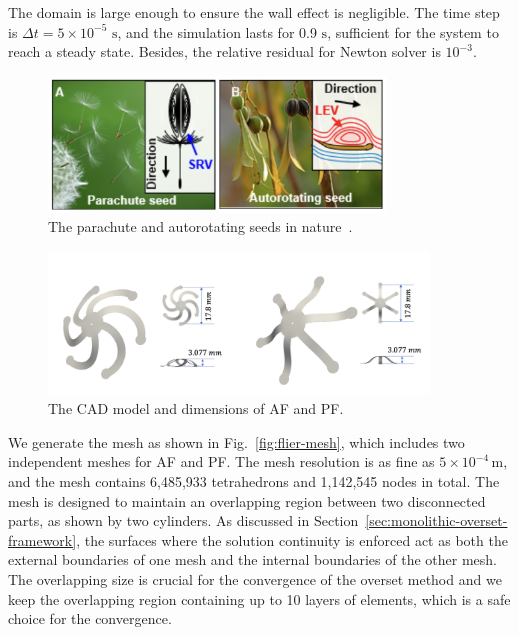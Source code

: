 \documentclass[preprint,12pt,sort&compress]{elsarticle}
\theoremstyle{definition}%
\begin{document}
The domain is large enough to ensure the wall effect is negligible.
The time step is $\Delta t=5\times 10^{-5}$ $\mathrm{s}$, and the simulation lasts for 0.9 $\mathrm{s}$, sufficient for the system to reach a steady state.
Besides, the relative residual for Newton solver
is $10^{-3}$.\\
\begin{figure}[!htbp]
    \centering
    \includegraphics[angle=0,width=0.8\textwidth]{fig/flier-seed.png}
    \caption{The parachute and autorotating seeds in nature~\cite{kim2023flier}.}
    \label{fig:flier-seed}
\end{figure}
\begin{figure}[!htbp]
    \centering
    \includegraphics[angle=0,width=0.9\textwidth]{fig/flier-CAD.png}
    \caption{The CAD model and dimensions of AF and PF.}
    \label{fig:flier-CAD}
\end{figure}
We generate the mesh as shown in Fig.~\ref{fig:flier-mesh}, which includes two independent meshes for AF and PF. 
The mesh resolution is as fine as $5\times 10^{-4}\,\mathrm{m}$, and the 
mesh contains 6,485,933 tetrahedrons and 1,142,545 nodes in total.
The mesh is designed to maintain an overlapping region between two disconnected parts, as shown by two cylinders. 
As discussed in Section~\ref{sec:monolithic-overset-framework}, the surfaces where the solution continuity is 
enforced act as both the external boundaries of one mesh and the internal boundaries of the other mesh.
The overlapping size is crucial for the convergence of the overset method and
we keep the overlapping region containing up to 10 layers of elements, which is a safe choice for the convergence.
\end{document}
